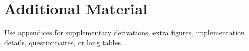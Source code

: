 \chapter{Additional Material}

Use appendices for supplementary derivations, extra figures, implementation details, questionnaires, or long tables.
